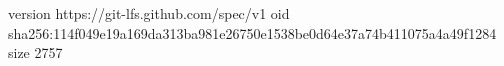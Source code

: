 version https://git-lfs.github.com/spec/v1
oid sha256:114f049e19a169da313ba981e26750e1538be0d64e37a74b411075a4a49f1284
size 2757
